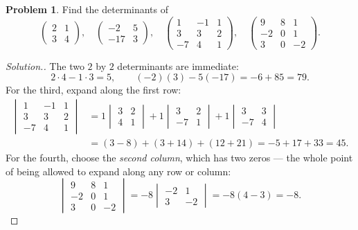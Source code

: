 \documentclass[11pt,a4paper]{article}
\theoremstyle{definition}
\newtheorem{problemx}{Problem}[section]
\newenvironment{problem}{\begin{problemx}}{\end{problemx}}
\newenvironment{solution}
  {\renewcommand{\qedsymbol}{}\begin{proof}[\textit{Solution}.]}
  {\end{proof}}
\begin{document}
\begin{problem}
Find the determinants of
$$\begin{pmatrix}2&1\\3&4\end{pmatrix},\quad
\begin{pmatrix}-2&5\\-17&3\end{pmatrix},\quad
\begin{pmatrix}1&-1&1\\3&3&2\\-7&4&1\end{pmatrix},\quad
\begin{pmatrix}9&8&1\\-2&0&1\\3&0&-2\end{pmatrix}.$$
\end{problem}
\begin{solution}
The two $2$ by $2$ determinants are immediate:
$$2\cdot 4-1\cdot 3=5,\qquad (-2)(3)-5(-17)=-6+85=79.$$
For the third, expand along the first row:
\begin{align*}
\begin{vmatrix}1&-1&1\\3&3&2\\-7&4&1\end{vmatrix}
&=1\begin{vmatrix}3&2\\4&1\end{vmatrix}
 +1\begin{vmatrix}3&2\\-7&1\end{vmatrix}
 +1\begin{vmatrix}3&3\\-7&4\end{vmatrix}\\
&=(3-8)+(3+14)+(12+21)=-5+17+33=45.
\end{align*}
For the fourth, choose the \emph{second column}, which has two zeros --- the
whole point of being allowed to expand along any row or column:
$$\begin{vmatrix}9&8&1\\-2&0&1\\3&0&-2\end{vmatrix}
=-8\begin{vmatrix}-2&1\\3&-2\end{vmatrix}=-8(4-3)=-8.$$
\end{solution}
\end{document}
